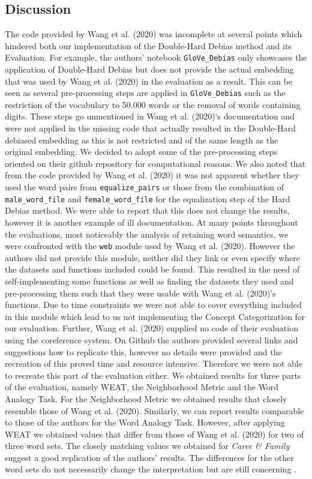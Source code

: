 \documentclass[
  english,
  man,floatsintext]{apa6}
\begin{document}
\hypertarget{discussion}{%
\subsection{Discussion}\label{discussion}}

The code provided by Wang et al. (2020) was incomplete at several points which hindered both our implementation of the Double-Hard Debias method and its Evaluation. For example, the authors' notebook \texttt{GloVe\_Debias} only showcases the application of Double-Hard Debias but does not provide the actual embedding that was used by Wang et al. (2020) in the evaluation as a result. This can be seen as several pre-processing steps are applied in \texttt{GloVe\_Debias} such as the restriction of the vocabulary to 50.000 words or the removal of words containing digits. These steps go unmentioned in Wang et al. (2020)`s documentation and were not applied in the missing code that actually resulted in the Double-Hard debiased embedding as this is not restricted and of the same length as the original embedding. We decided to adopt some of the pre-processing steps oriented on their github repository for computational reasons.
We also noted that from the code provided by Wang et al. (2020) it was not apparent whether they used the word pairs from \texttt{equalize\_pairs} or those from the combination of \texttt{male\_word\_file} and \texttt{female\_word\_file} for the equalization step of the Hard Debias method. We were able to report that this does not change the results, however it is another example of ill documentation.
At many points throughout the evaluations, most noticeably the analysis of retaining word semantics, we were confronted with the \texttt{web} module used by Wang et al. (2020). However the authors did not provide this module, neither did they link or even specify where the datasets and functions included could be found. This resulted in the need of self-implementing some functions as well as finding the datasets they used and pre-processing them such that they were usable with Wang et al. (2020)'s functions. Due to time constraints we were not able to cover everything included in this module which lead to us not implementing the Concept Categorization for our evaluation.
Further, Wang et al. (2020) supplied no code of their evaluation using the coreference system. On Github the authors provided several links and suggestions how to replicate this, however no details were provided and the recreation of this proved time and resource intensive. Therefore we were not able to recreate this part of the evaluation either.
We obtained results for three parts of the evaluation, namely WEAT, the Neighborhood Metric and the Word Analogy Task. For the Neighborhood Metric we obtained results that closely resemble those of Wang et al. (2020). Similarly, we can report results comparable to those of the authors for the Word Analogy Task. However, after applying WEAT we obtained values that differ from those of Wang et al. (2020) for two of three word sets. The closely matching values we obtained for \emph{Caree \& Family} suggest a good replication of the authors' results. The differences for the other word sets do not necessarily change the interpretation but are still concerning .
\end{document}
